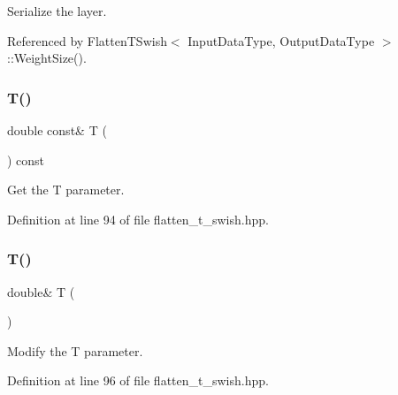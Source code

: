 Serialize the layer. 



Referenced by Flatten\+T\+Swish$<$ Input\+Data\+Type, Output\+Data\+Type $>$\+::\+Weight\+Size().

\mbox{\label{classmlpack_1_1ann_1_1FlattenTSwish_a021d1b881781ab65f452dfce5f95f30a}} 
\subsubsection{T()\hspace{0.1cm}{\footnotesize\ttfamily [1/2]}}
{\footnotesize\ttfamily double const\& T (\begin{DoxyParamCaption}{ }\end{DoxyParamCaption}) const\hspace{0.3cm}{\ttfamily [inline]}}



Get the T parameter. 



Definition at line 94 of file flatten\+\_\+t\+\_\+swish.\+hpp.

\mbox{\label{classmlpack_1_1ann_1_1FlattenTSwish_a4dc947770d1dd10271991850859bfc53}} 
\subsubsection{T()\hspace{0.1cm}{\footnotesize\ttfamily [2/2]}}
{\footnotesize\ttfamily double\& T (\begin{DoxyParamCaption}{ }\end{DoxyParamCaption})\hspace{0.3cm}{\ttfamily [inline]}}



Modify the T parameter. 



Definition at line 96 of file flatten\+\_\+t\+\_\+swish.\+hpp.

\mbox{\label{classmlpack_1_1ann_1_1FlattenTSwish_a7a2704698a50d9e00dfb083f3a863579}} 
